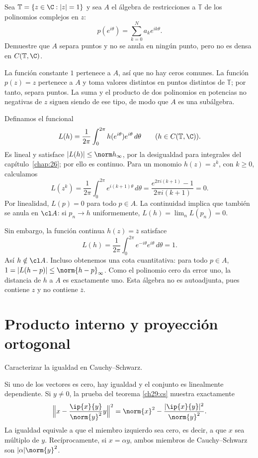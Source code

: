 \begin{ejercicio}\label{ej:lectura-28-4}
Sea $\mathbb T=\{z\in\C:|z|=1\}$ y sea $A$ el álgebra de restricciones a $\mathbb T$ de los polinomios complejos en $z$:
\[
 p(e^{i\theta})=\sum_{k=0}^N a_ke^{ik\theta}.
\]
Demuestre que $A$ separa puntos y no se anula en ningún punto, pero no es densa en $C(\mathbb T,\C)$.
\end{ejercicio}
\begin{solucion}
La función constante $1$ pertenece a $A$, así que no hay ceros comunes. La función $p(z)=z$ pertenece a $A$ y toma valores distintos en puntos distintos de $\mathbb T$; por tanto, separa puntos. La suma y el producto de dos polinomios en potencias no negativas de $z$ siguen siendo de ese tipo, de modo que $A$ es una subálgebra.

Definamos el funcional
\[
 L(h)=\frac1{2\pi}\int_0^{2\pi}h(e^{i\theta})e^{i\theta}\,d\theta
 \qquad(h\in C(\mathbb T,\C)).
\]
Es lineal y satisface $|L(h)|\le\norm h_\infty$, por la desigualdad para integrales del capítulo~\ref{chap:26}; por ello es continuo. Para un monomio $h(z)=z^k$, con $k\ge0$, calculamos
\[
 L(z^k)=\frac1{2\pi}\int_0^{2\pi}e^{i(k+1)\theta}\,d\theta
 =\frac{e^{2\pi i(k+1)}-1}{2\pi i(k+1)}=0.
\]
Por linealidad, $L(p)=0$ para todo $p\in A$. La continuidad implica que también se anula en $\cl A$: si $p_n\to h$ uniformemente, $L(h)=\lim_nL(p_n)=0$.

Sin embargo, la función continua $h(z)=\overline z$ satisface
\[
 L(h)=\frac1{2\pi}\int_0^{2\pi}e^{-i\theta}e^{i\theta}\,d\theta=1.
\]
Así $h\notin\cl A$. Incluso obtenemos una cota cuantitativa: para todo $p\in A$,
$1=|L(h-p)|\le\norm{h-p}_\infty$. Como el polinomio cero da error uno, la distancia de $h$ a $A$ es exactamente uno. Esta álgebra no es autoadjunta, pues contiene $z$ y no contiene $\overline z$.
\end{solucion}

\chapter{Producto interno y proyección ortogonal}

\begin{ejercicio}\label{ej:lectura-29-1}
Caracterizar la igualdad en Cauchy--Schwarz.
\end{ejercicio}
\begin{solucion}
Si uno de los vectores es cero, hay igualdad y el conjunto es linealmente dependiente. Si $y\ne0$, la prueba del teorema \ref{ch29:cs} muestra exactamente
\[
 \Big\|x-\frac{\ip{x}{y}}{\norm{y}^{2}}y\Big\|^{2}
 =\norm{x}^{2}-\frac{|\ip{x}{y}|^{2}}{\norm{y}^{2}}.
\]
La igualdad equivale a que el miembro izquierdo sea cero, es decir, a que $x$ sea múltiplo de $y$. Recíprocamente, si $x=\alpha y$, ambos miembros de Cauchy--Schwarz son $|\alpha|\norm{y}^{2}$.
\end{solucion}

